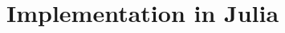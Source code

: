 \documentclass[conference]{IEEEtran}
\begin{document}
%
%
%
\section{Implementation in Julia}
\label{sec:implementation}
\end{document}
